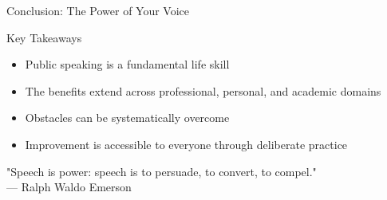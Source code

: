 \documentclass{beamer}
\begin{document}
\begin{frame}{Conclusion: The Power of Your Voice}
    \begin{block}{Key Takeaways}
        \begin{itemize}
            \item Public speaking is a fundamental life skill
            \item The benefits extend across professional, personal, and academic domains
            \item Obstacles can be systematically overcome
            \item Improvement is accessible to everyone through deliberate practice
        \end{itemize}
    \end{block}
    
    \begin{center}
        \large "Speech is power: speech is to persuade, to convert, to compel."\\
        \normalsize — Ralph Waldo Emerson
    \end{center}
\end{frame}
\end{document}
